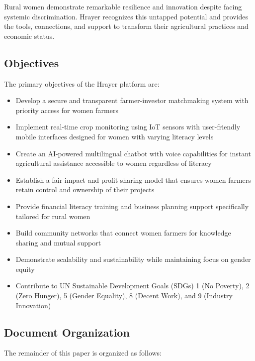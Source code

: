 \documentclass[9pt,twocolumn,twoside]{article}
\begin{document}
Rural women demonstrate remarkable resilience and innovation despite facing systemic discrimination. Hrayer recognizes this untapped potential and provides the tools, connections, and support to transform their agricultural practices and economic status.

\subsection{Objectives}

The primary objectives of the Hrayer platform are:

\begin{itemize}
  \item Develop a secure and transparent farmer-investor matchmaking system with priority access for women farmers
  \item Implement real-time crop monitoring using IoT sensors with user-friendly mobile interfaces designed for women with varying literacy levels
  \item Create an AI-powered multilingual chatbot with voice capabilities for instant agricultural assistance accessible to women regardless of literacy
  \item Establish a fair impact and profit-sharing model that ensures women farmers retain control and ownership of their projects
  \item Provide financial literacy training and business planning support specifically tailored for rural women
  \item Build community networks that connect women farmers for knowledge sharing and mutual support
  \item Demonstrate scalability and sustainability while maintaining focus on gender equity
  \item Contribute to UN Sustainable Development Goals (SDGs) 1 (No Poverty), 2 (Zero Hunger), 5 (Gender Equality), 8 (Decent Work), and 9 (Industry Innovation)
\end{itemize}

\subsection{Document Organization}

The remainder of this paper is organized as follows:
\end{document}
